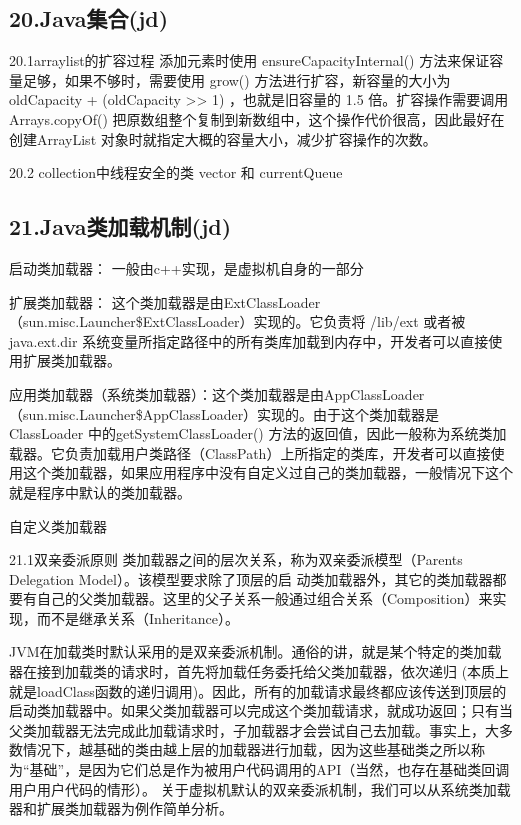 \documentclass[UTF8]{ctexart}
\begin{document}
\subsection{20.Java集合(jd)}

20.1arraylist的扩容过程
添加元素时使用 ensureCapacityInternal() 方法来保证容量足够，如果不够时，需要使用 grow() 方法进行扩容，新容量的大小为 oldCapacity + (oldCapacity >> 1) ，也就是旧容量的 1.5 倍。扩容操作需要调用Arrays.copyOf() 把原数组整个复制到新数组中，这个操作代价很高，因此最好在创建ArrayList 对象时就指定大概的容量大小，减少扩容操作的次数。

20.2 collection中线程安全的类
vector 和 currentQueue

\subsection{21.Java类加载机制(jd)}

启动类加载器： 一般由c++实现，是虚拟机自身的一部分

扩展类加载器： 这个类加载器是由ExtClassLoader（sun.misc.Launcher\$ExtClassLoader）实现的。它负责将 /lib/ext 或者被java.ext.dir 系统变量所指定路径中的所有类库加载到内存中，开发者可以直接使用扩展类加载器。

应用类加载器（系统类加载器）：这个类加载器是由AppClassLoader（sun.misc.Launcher\$AppClassLoader）实现的。由于这个类加载器是 ClassLoader 中的getSystemClassLoader() 方法的返回值，因此一般称为系统类加载器。它负责加载用户类路径（ClassPath）上所指定的类库，开发者可以直接使用这个类加载器，如果应用程序中没有自定义过自己的类加载器，一般情况下这个就是程序中默认的类加载器。

自定义类加载器

21.1双亲委派原则
类加载器之间的层次关系，称为双亲委派模型（Parents Delegation Model）。该模型要求除了顶层的启
动类加载器外，其它的类加载器都要有自己的父类加载器。这里的父子关系一般通过组合关系（Composition）来实现，而不是继承关系（Inheritance）。

JVM在加载类时默认采用的是双亲委派机制。通俗的讲，就是某个特定的类加载器在接到加载类的请求时，首先将加载任务委托给父类加载器，依次递归 (本质上就是loadClass函数的递归调用)。因此，所有的加载请求最终都应该传送到顶层的启动类加载器中。如果父类加载器可以完成这个类加载请求，就成功返回；只有当父类加载器无法完成此加载请求时，子加载器才会尝试自己去加载。事实上，大多数情况下，越基础的类由越上层的加载器进行加载，因为这些基础类之所以称为“基础”，是因为它们总是作为被用户代码调用的API（当然，也存在基础类回调用户用户代码的情形）。 关于虚拟机默认的双亲委派机制，我们可以从系统类加载器和扩展类加载器为例作简单分析。
\end{document}
